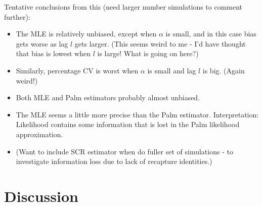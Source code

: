 \documentclass[useAMS, usenatbib, referee]{biom}\usepackage[]{graphicx}\usepackage[]{color}
\begin{document}
Tentative conclusions from this (need larger number simulations to comment further):
\begin{itemize}

\item The MLE is relatively unbiased, except when $\alpha$ is small, and in this case bias gets worse as lag $l$ gets larger. (This seems weird to me - I'd have thought that bias is lowest when $l$ is large! What is going on here?)

\item Similarly, percentage CV is worst when  $\alpha$ is small and lag $l$ is big. (Again weird!)

\item Both MLE and Palm estimators probably almost unbiased.

\item The MLE seems a little more precise than the Palm estimator. Interpretation: Likelihood contains some information that is lost in the Palm likelihood approximation.

\item (Want to include SCR estimator when do fuller set of simulations - to investigate information loss due to lack of recapture identities.)

\end{itemize}


\section{Discussion\label{sec:discussion}}
\end{document}
